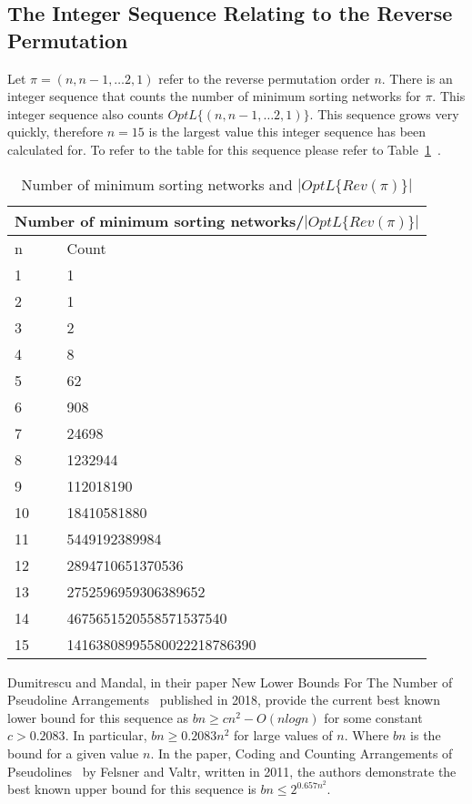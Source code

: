 \subsection{The Integer Sequence Relating to the Reverse Permutation}
Let $\pi=(n,n-1, \dots 2,1)$ refer to the reverse permutation order $n$. 
There is an integer sequence that counts the number of minimum sorting networks 
for $\pi$. This integer sequence also counts $OptL\{(n,n-1, \dots 2,1)\}$. This sequence grows very quickly, therefore $n=15$ 
is  the largest value this integer sequence has been calculated for. To refer to the table for this sequence 
please refer to Table~\ref{Tab:IntSeq1}~\cite{A30}.
\begin{table}[t]
    \begin{center}

    \begin{tabular}{|p{2cm}||p{8cm}|}
        \hline
        \multicolumn{2}{|c|}{Number of minimum sorting networks/$|OptL\{Rev(\pi)\}|$}\\
        \hline
        n & Count \\ 
        \hline 
        1 & 1 \\
        \hline 
        2 & 1 \\
        \hline 
        3 & 2 \\
        \hline 
        4 & 8 \\
        \hline 
        5 & 62 \\
        \hline 
        6 & 908 \\
        \hline 
        7 & 24698 \\
        \hline 
        8 & 1232944 \\
        \hline 
        9 & 112018190 \\
        \hline 
        10 & 18410581880 \\
        \hline 
        11 & 5449192389984 \\ 
        \hline 
        12 & 2894710651370536 \\
        \hline 
        13 & 2752596959306389652 \\
        \hline 
        14 & 4675651520558571537540 \\
        \hline 
        15 & 14163808995580022218786390 \\
        \hline 
    \end{tabular}
    \end{center}
    \caption{Number of minimum sorting networks and $|OptL\{Rev(\pi)\}|$}
    \label{Tab:IntSeq1}
\end{table}\par
Dumitrescu and Mandal, in their paper New Lower Bounds For The Number of Pseudoline Arrangements~\cite{A33}
published in 2018, provide the current best known lower bound for this sequence as  
$bn \geq cn^{2} - O(n log n)$ for some constant $c > 0.2083$. In particular, $bn \geq 0.2083 n^{2}$
for large values of $n$. Where $bn$ is the bound for a given value $n$. In the paper, Coding 
and Counting Arrangements of Pseudolines~\cite{A32} by Felsner and Valtr, written in 2011, the authors demonstrate 
the best known upper bound for this sequence is $bn \leq 2^{0.657n^{2}}$.\par 

